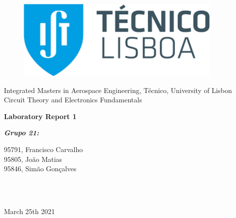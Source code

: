 \documentclass[11en, a4paper, oneside]{article}
\begin{document}
\begin{titlepage}
	\begin{center}
		\begin{figure}[htb!]
			\begin{center}
				\includegraphics[width=10cm]{tecnico.png}
			\end{center}
		\end{figure}
		
        \vspace{30pt}
        \begin{center}
        \Large{\center Integrated Masters in Aerospace Engineering, Técnico, University of Lisbon}\\
        \Large{\center Circuit Theory and Electronics Fundamentals}\\
        \end{center}
            
        \vspace{60pt}
        \Huge{\textbf{Laboratory Report 1}}
        
        \vspace{120pt}
        \begin{minipage}{0.4\textwidth}
		\begin{flushleft} \large
			\emph{\LARGE{\textbf{Grupo 21:}}}\par \vspace{10pt}
			95791, Francisco Carvalho \\ \vspace{20pt}
            95805, João Matias\\ \vspace{20pt}
            95846, Simão Gonçalves\\ \vspace{20pt}
		\end{flushleft}
	\end{minipage}
	~
	\begin{minipage}[b]{0.4\textwidth}
		\begin{flushright} \large
        	{}
		\end{flushright}
	\end{minipage}\\[2cm]
       \vspace{10pt}
        \large{March 25th 2021}\\
	\end{center}
\end{titlepage}
\end{document}

